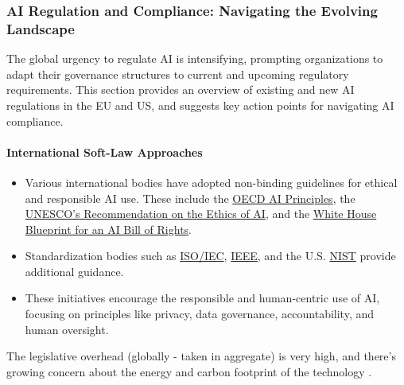 \subsubsection{AI Regulation and Compliance: Navigating the Evolving Landscape}

The global urgency to regulate AI is intensifying, prompting organizations to adapt their governance structures to current and upcoming regulatory requirements. This section provides an overview of existing and new AI regulations in the EU and US, and suggests key action points for navigating AI compliance.

\paragraph{International Soft-Law Approaches}
\begin{itemize}
\item Various international bodies have adopted non-binding guidelines for ethical and responsible AI use. These include the \href{https://oecd.ai/en/ai-principles}{OECD AI Principles}, the \href{https://www.unesco.org/en/artificial-intelligence/recommendation-ethics}{UNESCO’s Recommendation on the Ethics of AI}, and the \href{https://www.whitehouse.gov/ostp/ai-bill-of-rights/}{White House Blueprint for an AI Bill of Rights}.
\item Standardization bodies such as \href{https://www.iso.org/standard/77608.html}{ISO/IEC}, \href{https://standards.ieee.org/initiatives/autonomous-intelligence-systems/}{IEEE}, and the U.S. \href{https://nvlpubs.nist.gov/nistpubs/ai/NIST.AI.100-1.pdf}{NIST} provide additional guidance.
\item These initiatives encourage the responsible and human-centric use of AI, focusing on principles like privacy, data governance, accountability, and human oversight.
\end{itemize}

The legislative overhead (globally - taken in aggregate) is very high, and there's growing concern about the energy and carbon footprint of the technology \cite{wu2022sustainable}. 


